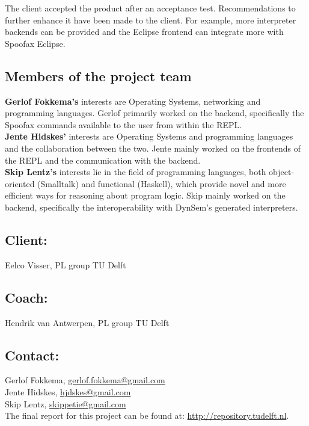The client accepted the product after an acceptance test. Recommendations to
further enhance it have been made to the client. For example, more interpreter
backends can be provided and the Eclipse frontend can integrate more with
Spoofax Eclipse.

\subsection*{Members of the project team}
\textbf{Gerlof Fokkema's} interests are Operating Systems, networking and
programming languages. Gerlof primarily worked on the backend, specifically the
Spoofax commands available to the user from within the REPL.\\
\textbf{Jente Hidskes'} interests are Operating Systems and programming
languages and the collaboration between the two. Jente mainly worked
on the frontends of the REPL and the communication with the backend.\\
\textbf{Skip Lentz's} interests lie in the field of programming languages,
both object-oriented (Smalltalk) and functional (Haskell), which provide
novel and more efficient ways for reasoning about program logic. Skip mainly
worked on the backend, specifically the interoperability with DynSem's
generated interpreters.

\subsection*{Client:}
Eelco Visser, PL group TU Delft

\subsection*{Coach:}
Hendrik van Antwerpen, PL group TU Delft

\subsection*{Contact:}
Gerlof Fokkema, \href{mailto:gerlof.fokkema@gmail.com}{gerlof.fokkema@gmail.com}\\
Jente Hidskes, \href{mailto:hjdskes@gmail.com}{hjdskes@gmail.com}\\
Skip Lentz, \href{mailto:skippetie@gmail.com}{skippetie@gmail.com}\\

\noindent The final report for this project can be found at: \url{http://repository.tudelft.nl}.


